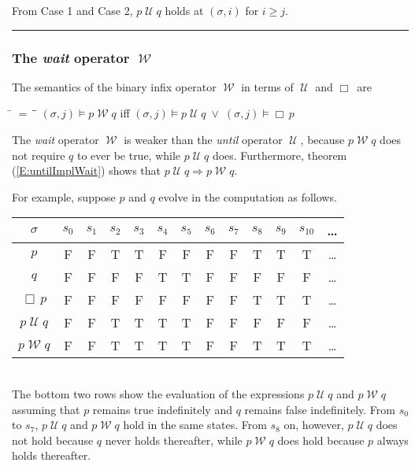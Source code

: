 \documentclass[12pt, fleqn, leqno]{article}
\newcommand{\lllgap}{12pt}                          %
\newcommand{\mymathindent}{24pt}                    %
\newcommand{\impl}{\ensuremath{\Rightarrow}}        %
\newcommand{\Until}{\;\mathcal{U}\;}
\newcommand{\Wait}{\;\mathcal{W}\;}
\newcommand{\Always}{\Box\,}
\newcommand{\myqed}{\rule[-.23ex]{1.2ex}{2.0ex}}
\newcommand{\myqedtab}{\hspace{384pt}}              %
\begin{document}
From Case 1 and Case 2, $p\Until q$ holds at $(\sigma,i)$ for $i\ge j$. \quad \myqed

\subsubsection*{The \textit{wait} operator $\Wait$}

The semantics of the binary infix operator $\Wait$ in terms of $\Until$ and $\Always$ are
\begin{tabbing}
\hspace{\mymathindent} \= $= \;$ \= \myqedtab \= \kill
  \> $(\sigma, j) \models p \Wait q$ \quad iff \quad $(\sigma, j) \models p \Until q \; \lor \; (\sigma, j) \models \Always p$
\end{tabbing}
The \textit{wait} operator $\Wait$ is weaker than the \textit{until} operator $\Until$, because $p\Wait q$ does not require $q$ to ever be true,
while $p\Until q$ does.
Furthermore, theorem (\ref{E:untilImplWait}) shows that $p \Until q \impl p \Wait q$.

For example, suppose $p$ and $q$ evolve in the computation as follows.\\[\lllgap]
\begin{tabular}{c|cccccccccccc}
  $\sigma$       & $s_0$ & $s_1$ & $s_2$ & $s_3$ & $s_4$ & $s_5$ & $s_6$ & $s_7$ & $s_8$& $s_9$  & $s_{10}$&  \dots \\
  \hline
  $p$            & F     & F     & T     & T     & F     & F     & F     & F     & T     & T     & T     &  \dots\\
  $q$            & F     & F     & F     & F     & T     & T     & F     & F     & F     & F     & F     &  \dots\\
  $\Always p$    & F     & F     & F     & F     & F     & F     & F     & F     & T     & T     & T     &  \dots\\
  $p\Until q$    & F     & F     & T     & T     & T     & T     & F     & F     & F     & F     & F     &  \dots\\
  $p\Wait q$     & F     & F     & T     & T     & T     & T     & F     & F     & T     & T     & T     &  \dots\\
\end{tabular}\\[\lllgap]
The bottom two rows show the evaluation of the expressions $p\Until q$ and $p\Wait q$
assuming that $p$ remains true indefinitely and $q$ remains false indefinitely.
From $s_0$ to $s_7$, $p\Until q$ and $p\Wait q$ hold in the same states.
From $s_8$ on, however, $p\Until q$ does not hold because $q$ never holds thereafter,
while $p\Wait q$ does hold because $p$ always holds thereafter.
\end{document}
